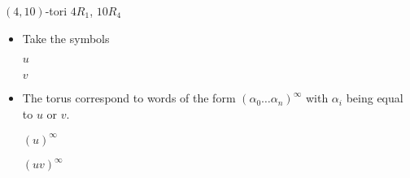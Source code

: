 \documentclass[%
pdf,
colorBG,
slideColor,
]{prosper}
\begin{document}
\begin{slide}{$(4,10)$-tori $4R_1$, $10R_4$}
\begin{itemize}
\item Take the symbols
\begin{center}
\begin{minipage}{5.3cm}
\centering
{}\par
$u$
\end{minipage}
\begin{minipage}{5.3cm}
\centering
{}\par
$v$
\end{minipage}
\end{center}
\item The torus correspond to words of the form $(\alpha_0\dots\alpha_n)^{\infty}$ with $\alpha_i$ being equal to $u$ or $v$.
\begin{center}
\begin{minipage}{5.2cm}
\centering
{}\par
$(u)^{\infty}$
\end{minipage}
\begin{minipage}{5.2cm}
\centering
{}\par
$(uv)^{\infty}$
\end{minipage}
\end{center}

\end{itemize}
\end{slide}
\end{document}
